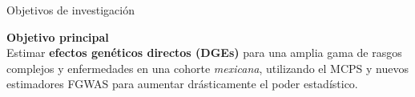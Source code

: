 \begin{frame}[c]{Objetivos de investigación}
  \begin{center}
    {\sffamily\bfseries\Large\color{ccgblue}
      Objetivo principal
    }\\[0.25cm]
    {\sffamily\large
      Estimar \textbf{efectos genéticos directos (DGEs)} para una amplia gama de rasgos complejos
      y enfermedades en una cohorte \textit{mexicana}, utilizando el MCPS y nuevos estimadores
      FGWAS para aumentar drásticamente el poder estadístico.
    }
    \vfill
  \end{center}
\end{frame}

